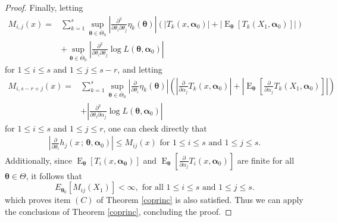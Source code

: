 \documentclass[10pt,a4paper,onecolumn]{article} %
\newcommand{\f}{\on}
\newcommand{\bs}{\boldsymbol}
\newcommand{\on}{\operatorname}
\begin{document}
\begin{appendix}
\begin{proof}
Finally, letting
\begin{equation*}
\begin{aligned}
M_{i,j}(x)= &\sum_{k=1}^s \sup_{\bs{\theta}\in \overline{\Theta}_0} \left|\frac{\partial^2}{\partial \theta_i \partial \theta_j} \eta_k(\bs{\theta})\right|\left(\left|T_k(x,\bs{\alpha}_0)\right|+\left|\on{E}_{\bs{\theta}}\left[T_k(X_1,\bs{\alpha}_0)\right]\right|\right)\\&+\sup_{\bs{\theta}\in \overline{\Theta}_0}\left|\frac{\partial^2}{\partial \theta_i \partial \theta_j}\log L(\bs{\theta},\bs{\alpha}_0)\right|
\end{aligned}
\end{equation*}
for $1\leq i\leq s$ and $1\leq j\leq s-r$, and letting
\begin{equation*}
\begin{aligned}
M_{i,s-r+j}(x)=&\sum_{k=1}^s \sup_{\bs{\theta}\in \overline{\Theta}_0}\left| \frac{\partial}{\partial \theta_i} \eta_k(\bs{\theta})\right|\left(\left|\frac{\partial}{\partial \alpha_j}T_k(x,\bs{\alpha}_0)\right|+\left|\on{E}_{\bs{\theta}}\left[\frac{\partial}{\partial \alpha_j}T_k(X_1,\bs{\alpha}_0)\right]\right|\right)\\&+\left|\frac{\partial^2}{\partial \theta_i \partial \alpha_j}\log L(\bs{\theta},\bs{\alpha}_0)\right|
\end{aligned}
\end{equation*}
for $1\leq i\leq s$ and $1\leq j\leq r$, one can check directly that
\begin{equation*}
 \begin{aligned}
 \left|\frac{\partial}{\partial\theta_i} h_j(x\, ;\, \bs{\theta},\bs{\alpha}_0)\right|\leq M_{ij}(x)\mbox{ for }1\leq i\leq s\mbox{ and }1\leq j\leq s.
 \end{aligned}
 \end{equation*}
 Additionally, since $\f{E}_{\bs{\theta}}\left[T_i(x,\bs{\alpha_0})\right]$ and $\f{E}_{\bs{\theta}}\left[\frac{\partial}{\partial \alpha_j} T_i(x,\bs{\alpha}_0)\right]$ are finite for all $\bs{\theta}\in \Theta$, it follows that
\begin{equation*}E_{\bs{\theta}_0}\left[M_{ij}(X_1)\right]<\infty,\mbox{ for all }1\leq i\leq s \mbox{ and }1\leq j\leq s.
\end{equation*}
which proves item $(C)$ of Theorem \ref{coprinc} is also satisfied. Thus we can apply the conclusions of Theorem \ref{coprinc}, concluding the proof.
\end{proof}



\end{appendix} 




\end{document}
